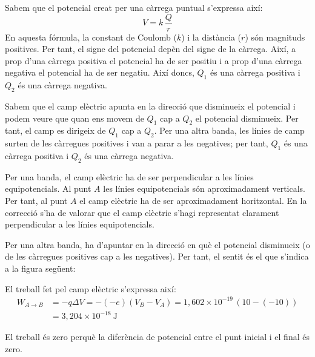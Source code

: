 \begin{solapartat}
 Sabem que el potencial creat per una càrrega puntual s'expressa així:
\[ V = k\,\frac{Q}{r} \]
En aquesta fórmula, la constant de Coulomb ($k$) i la distància ($r$) són magnituds positives. Per tant, el signe del potencial depèn del signe de la càrrega. Així, a prop d'una càrrega positiva el potencial ha de ser positiu i a prop d'una càrrega negativa el potencial ha de ser negatiu. Així doncs, $Q_1$ és una càrrega positiva i $Q_2$ és una càrrega negativa.


Sabem que el camp elèctric apunta en la direcció que disminueix el potencial i podem veure que quan ens movem de $Q_1$ cap a $Q_2$ el potencial disminueix. Per tant, el camp es dirigeix de $Q_1$ cap a $Q_2$. Per una altra banda, les línies de camp surten de les càrregues positives i van a parar a les negatives; per tant, $Q_1$ és una càrrega positiva i $Q_2$ és una càrrega negativa.

 Per una banda, el camp elèctric ha de ser perpendicular a les línies equipotencials. Al punt $A$ les línies equipotencials són aproximadament verticals. Per tant, al punt $A$ el camp elèctric ha de ser aproximadament horitzontal. En la correcció s'ha de valorar que el camp elèctric s'hagi representat clarament perpendicular a les línies equipotencials.

 Per una altra banda, ha d'apuntar en la direcció en què el potencial disminueix (o de les càrregues positives cap a les negatives). Per tant, el sentit és el que s'indica a la figura següent:
\end{solapartat}

\begin{solapartat}
 El treball fet pel camp elèctric s'expressa així:
\begin{align*}
W_{A\to B} &= -q\Delta V = -(-e)(V_B - V_A) = 1,602\times 10^{-19}\,(10 - (-10))\\
&= 3,204\times 10^{-18}\ \mathrm{J}
\end{align*}

 El treball és zero perquè la diferència de potencial entre el punt inicial i el final és zero.
\end{solapartat}
